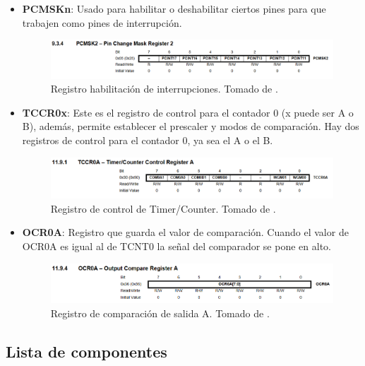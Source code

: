\begin{itemize}
    \item \textbf{PCMSKn}: Usado para habilitar o deshabilitar ciertos pines para que trabajen como pines de interrupción.
    \begin{figure}[H]
        \centering
        \includegraphics[width=.9\linewidth]{informe/Carpeta tex/Imagenes/PCMSK.png}
        \caption{Registro habilitación de interrupciones. Tomado de \cite{web}.}
        \label{fig7}
    \end{figure}

    \item \textbf{TCCR0x}: Este es el registro de control para el contador 0 (x puede ser A o B), además, permite establecer el prescaler y modos de comparación. Hay dos registros de control para el contador 0, ya sea el A o el B.
    \begin{figure}[H]
        \centering
        \includegraphics[width=.9\linewidth]{informe/Carpeta tex/Imagenes/TCCR0A.png}
        \caption{Registro de control de Timer/Counter. Tomado de \cite{web}.}
        \label{fig8}
    \end{figure}

    \item \textbf{OCR0A}: Registro que guarda el valor de comparación. Cuando el valor de OCR0A es igual al de TCNT0 la señal del comparador se pone en alto.
    \begin{figure}[H]
        \centering
        \includegraphics[width=.9\linewidth]{informe/Carpeta tex/Imagenes/OCR0A.png}
        \caption{Registro de comparación de salida A. Tomado de \cite{web}.}
        \label{fig9}
    \end{figure}
    
\end{itemize}

\subsection*{Lista de componentes}

